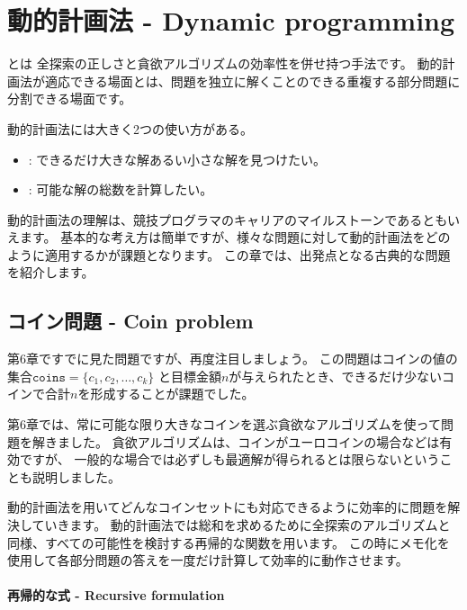 \chapter{動的計画法 - Dynamic programming}


とは
全探索の正しさと貪欲アルゴリズムの効率性を併せ持つ手法です。
動的計画法が適応できる場面とは、問題を独立に解くことのできる重複する部分問題に分割できる場面です。

動的計画法には大きく2つの使い方がある。

\begin{itemize}
\item
{}:
できるだけ大きな解あるい小さな解を見つけたい。
\item
{}:
可能な解の総数を計算したい。
\end{itemize}

動的計画法の理解は、競技プログラマのキャリアのマイルストーンであるともいえます。
基本的な考え方は簡単ですが、様々な問題に対して動的計画法をどのように適用するかが課題となります。
この章では、出発点となる古典的な問題を紹介します。

\section{コイン問題 - Coin problem}

第6章ですでに見た問題ですが、再度注目しましょう。
この問題はコインの値の集合$\texttt{coins} = \{c_1,c_2,\ldots,c_k\}$
と目標金額$n$が与えられたとき、できるだけ少ないコインで合計$n$を形成することが課題でした。

第6章では、常に可能な限り大きなコインを選ぶ貪欲なアルゴリズムを使って問題を解きました。
貪欲アルゴリズムは、コインがユーロコインの場合などは有効ですが、
一般的な場合では必ずしも最適解が得られるとは限らないということも説明しました。

動的計画法を用いてどんなコインセットにも対応できるように効率的に問題を解決していきます。
動的計画法では総和を求めるために全探索のアルゴリズムと同様、すべての可能性を検討する再帰的な関数を用います。
この時にメモ化を使用して各部分問題の答えを一度だけ計算して効率的に動作させます。

\subsubsection{再帰的な式 - Recursive formulation}

